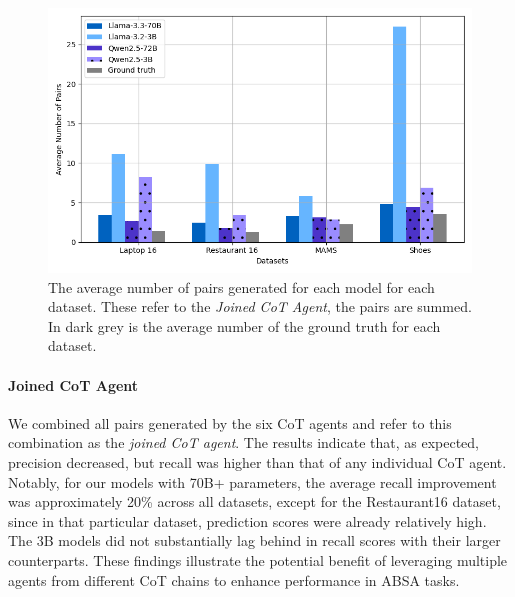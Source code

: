 \documentclass[11pt]{article}
\begin{document}





\begin{figure}[h]
    \centering
    \includegraphics[width=0.8\linewidth]{figures/n_labels_new.png}
    \caption{The average number of pairs generated for each model for each dataset. These refer to the \textit{Joined CoT Agent}, the pairs are summed. In dark grey is the average number of the ground truth for each dataset.}
    \label{fig:n_labels}
\end{figure}

\paragraph{Joined CoT Agent}
We combined all pairs generated by the six CoT agents and refer to this combination as the \textit{joined CoT agent}. The results indicate that, as expected, precision decreased, but recall was higher than that of any individual CoT agent. Notably, for our models with 70B+ parameters, the average recall improvement was approximately 20\% across all datasets, except for the Restaurant16 dataset, since in that particular dataset, prediction scores were already relatively high. The 3B models did not substantially lag behind in recall scores with their larger counterparts. These findings illustrate the potential benefit of leveraging multiple agents from different CoT chains to enhance performance in ABSA tasks.
\end{document}
